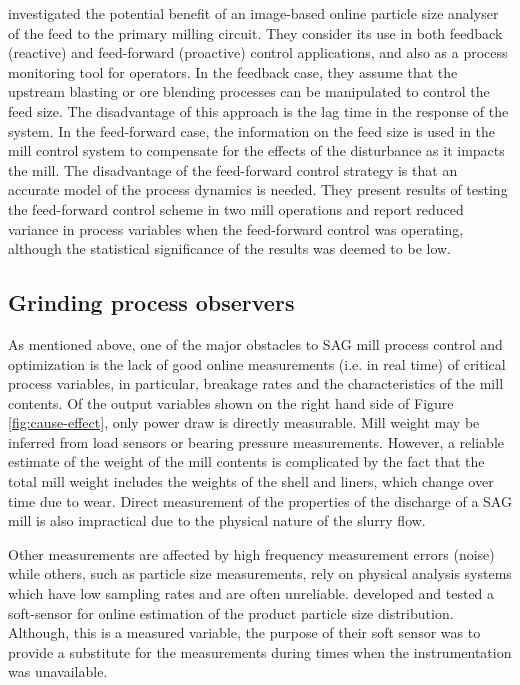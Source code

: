 \cite{steyn_investigating_2018} investigated the potential benefit of an image-based online particle size analyser of the feed to the primary milling circuit. They consider its use in both feedback (reactive) and feed-forward (proactive) control applications, and also as a process monitoring tool for operators. In the feedback case, they assume that the upstream blasting or ore blending processes can be manipulated to control the feed size. The disadvantage of this approach is the lag time in the response of the system. In the feed-forward case, the information on the feed size is used in the mill control system to compensate for the effects of the disturbance as it impacts the mill. The disadvantage of the feed-forward control strategy is that an accurate model of the process dynamics is needed. They present results of testing the feed-forward control scheme in two mill operations and report reduced variance in process variables when the feed-forward control was operating, although the statistical significance of the results was deemed to be low.

\subsection{Grinding process observers}

As mentioned above, one of the major obstacles to \gls{SAG} mill process control and optimization is the lack of good online measurements (i.e. in real time) of critical process variables, in particular, breakage rates and the characteristics of the mill contents. Of the output variables shown on the right hand side of Figure \ref{fig:cause-effect}, only power draw is directly measurable. Mill weight may be inferred from load sensors or bearing pressure measurements. However, a reliable estimate of the weight of the mill contents is complicated by the fact that the total mill weight includes the weights of the shell and liners, which change over time due to wear. Direct measurement of the properties of the discharge of a \gls{SAG} mill is also impractical due to the physical nature of the slurry flow.

Other measurements are affected by high frequency measurement errors (noise) while others, such as particle size measurements, rely on physical analysis systems which have low sampling rates and are often unreliable. \cite{casali_particle_1998} developed and tested a soft-sensor for online estimation of the product particle size distribution. Although, this is a measured variable, the purpose of their soft sensor was to provide a substitute for the measurements during times when the instrumentation was unavailable.

